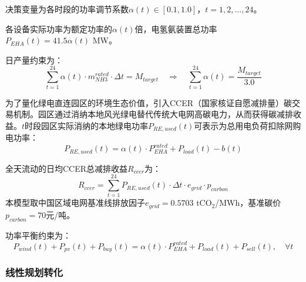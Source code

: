 决策变量为各时段的功率调节系数$\alpha(t) \in [0.1, 1.0]$，$t = 1, 2, ..., 24$。



各设备实际功率为额定功率的$\alpha(t)$倍，电氢氨装置总功率$P_{EHA}(t) = 41.5\alpha(t)$ MW。

日产量约束为：
\begin{equation}\label{eq:q3_prod}
\sum_{t=1}^{24} \alpha(t) \cdot m_{NH3}^{rated} \cdot \Delta t = M_{target} \quad \Rightarrow \quad \sum_{t=1}^{24} \alpha(t) = \frac{M_{target}}{3.0}
\end{equation}

为了量化绿电直连园区的环境生态价值，引入CCER（国家核证自愿减排量）碳交易机制。园区通过消纳本地风光绿电替代传统大电网高碳电力，从而获得碳减排收益\cite{ref6}。$t$时段园区实际消纳的本地绿电功率$P_{RE,used}(t)$可表示为总用电负荷扣除网购电功率：
\begin{equation}
P_{RE,used}(t) = \alpha(t) \cdot P_{EHA}^{rated} + P_{load}(t) - b(t)
\end{equation}

全天流动的日均CCER总减排收益$R_{ccer}$为：
\begin{equation}
R_{ccer} = \sum_{t=1}^{24} P_{RE,used}(t) \cdot \Delta t \cdot e_{grid} \cdot p_{carbon}
\end{equation}
本模型取中国区域电网基准线排放因子$e_{grid} = 0.5703$ tCO$_2$/MWh，基准碳价$p_{carbon} = 70$元/吨。

功率平衡约束为：
\begin{equation}
P_{wind}(t) + P_{pv}(t) + P_{buy}(t) = \alpha(t) \cdot P_{EHA}^{rated} + P_{load}(t) + P_{sell}(t), \quad \forall t
\end{equation}

\subsubsection{线性规划转化}


